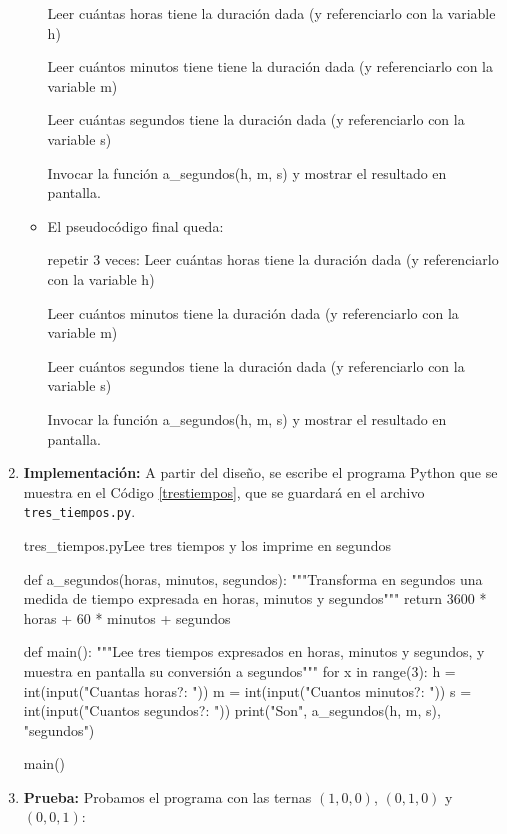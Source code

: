 \begin{enumerate}
\begin{itemize}
\begin{codigo-nohl-sn}
Leer cuántas horas tiene la duración dada
 (y referenciarlo con la variable h)

Leer cuántos minutos tiene tiene la duración dada
 (y referenciarlo con la variable m)

Leer cuántas segundos tiene la duración dada
 (y referenciarlo con la variable s)

Invocar la función a_segundos(h, m, s) y
mostrar el resultado en pantalla.
\end{codigo-nohl-sn}

\item El pseudocódigo final queda:

\begin{codigo-nohl-sn}
repetir 3 veces:
    Leer cuántas horas tiene la duración dada
     (y referenciarlo con la variable h)

    Leer cuántos minutos tiene la duración dada
     (y referenciarlo con la variable m)

    Leer cuántos segundos tiene la duración dada
     (y referenciarlo con la variable s)

    Invocar la función a_segundos(h, m, s) y
    mostrar el resultado en pantalla.
\end{codigo-nohl-sn}

\end{itemize}
\item {\bf Implementación:} A partir del diseño, se escribe el programa
Python que se muestra en el Código \ref{trestiempos}, que se guardará
en el archivo \verb!tres_tiempos.py!.

\begin{codigo}{\label{trestiempos} tres\_tiempos.py}{Lee tres tiempos y los imprime en segundos}
\begin{codigo-python}
def a_segundos(horas, minutos, segundos):
    """Transforma en segundos una medida de tiempo expresada en
       horas, minutos y segundos"""
    return 3600 * horas + 60 * minutos + segundos

def main():
    """Lee tres tiempos expresados en horas, minutos y segundos,
       y muestra en pantalla su conversión a segundos"""
    for x in range(3):
        h = int(input("Cuantas horas?: "))
        m = int(input("Cuantos minutos?: "))
        s = int(input("Cuantos segundos?: "))
        print("Son", a_segundos(h, m, s), "segundos")

main()
\end{codigo-python}
\end{codigo}

\item {\bf Prueba: } Probamos el programa con las ternas $(1,0,0)$, $(0,1,0)$ y
$(0,0,1)$:

\end{enumerate}

